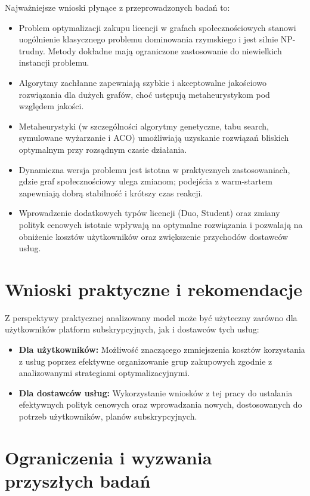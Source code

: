 Najważniejsze wnioski płynące z przeprowadzonych badań to:

\begin{itemize}
    \item Problem optymalizacji zakupu licencji w grafach społecznościowych stanowi uogólnienie klasycznego problemu dominowania rzymskiego i jest silnie NP-trudny. Metody dokładne mają ograniczone zastosowanie do niewielkich instancji problemu.
    \item Algorytmy zachłanne zapewniają szybkie i akceptowalne jakościowo rozwiązania dla dużych grafów, choć ustępują metaheurystykom pod względem jakości.
    \item Metaheurystyki (w szczególności algorytmy genetyczne, tabu search, symulowane wyżarzanie i ACO) umożliwiają uzyskanie rozwiązań bliskich optymalnym przy rozsądnym czasie działania.
    \item Dynamiczna wersja problemu jest istotna w praktycznych zastosowaniach, gdzie graf społecznościowy ulega zmianom; podejścia z warm-startem zapewniają dobrą stabilność i krótszy czas reakcji.
    \item Wprowadzenie dodatkowych typów licencji (Duo, Student) oraz zmiany polityk cenowych istotnie wpływają na optymalne rozwiązania i pozwalają na obniżenie kosztów użytkowników oraz zwiększenie przychodów dostawców usług.
\end{itemize}

\section{Wnioski praktyczne i rekomendacje}

Z perspektywy praktycznej analizowany model może być użyteczny zarówno dla użytkowników platform subskrypcyjnych, jak i dostawców tych usług:

\begin{itemize}
    \item \textbf{Dla użytkowników:} Możliwość znaczącego zmniejszenia kosztów korzystania z usług poprzez efektywne organizowanie grup zakupowych zgodnie z analizowanymi strategiami optymalizacyjnymi.
    \item \textbf{Dla dostawców usług:} Wykorzystanie wniosków z tej pracy do ustalania efektywnych polityk cenowych oraz wprowadzania nowych, dostosowanych do potrzeb użytkowników, planów subskrypcyjnych.
\end{itemize}

\section{Ograniczenia i wyzwania przyszłych badań}

